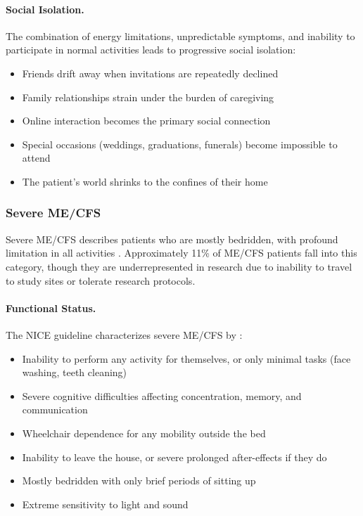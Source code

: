 \paragraph{Social Isolation.}
The combination of energy limitations, unpredictable symptoms, and inability to participate in normal activities leads to progressive social isolation:
\begin{itemize}
    \item Friends drift away when invitations are repeatedly declined
    \item Family relationships strain under the burden of caregiving
    \item Online interaction becomes the primary social connection
    \item Special occasions (weddings, graduations, funerals) become impossible to attend
    \item The patient's world shrinks to the confines of their home
\end{itemize}

\subsubsection{Severe ME/CFS}

Severe ME/CFS describes patients who are mostly bedridden, with profound limitation in all activities \cite{Carruthers2011ICC}. Approximately 11\% of ME/CFS patients fall into this category, though they are underrepresented in research due to inability to travel to study sites or tolerate research protocols.

\paragraph{Functional Status.}
The NICE guideline characterizes severe ME/CFS by \cite{NICE2021mecfs}:
\begin{itemize}
    \item Inability to perform any activity for themselves, or only minimal tasks (face washing, teeth cleaning)
    \item Severe cognitive difficulties affecting concentration, memory, and communication
    \item Wheelchair dependence for any mobility outside the bed
    \item Inability to leave the house, or severe prolonged after-effects if they do
    \item Mostly bedridden with only brief periods of sitting up
    \item Extreme sensitivity to light and sound
\end{itemize}

